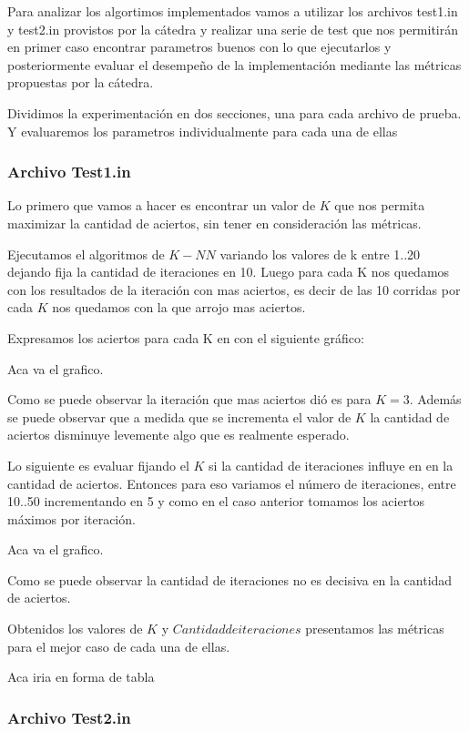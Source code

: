 Para analizar los algortimos implementados vamos a utilizar los archivos test1.in y test2.in provistos por la cátedra y realizar una serie de test que nos permitirán en primer caso encontrar parametros buenos con lo que ejecutarlos y posteriormente evaluar el desempeño de la implementación mediante las métricas propuestas por la cátedra.

Dividimos la experimentación en dos secciones, una para cada archivo de prueba. Y evaluaremos los parametros individualmente para cada una de ellas


\subsubsection {Archivo Test1.in}


Lo primero que vamos a hacer es encontrar un valor de $K$ que nos permita maximizar la cantidad de aciertos, sin tener en consideración las métricas.

Ejecutamos el algoritmos de $K-NN$ variando los valores de k entre {1..20} dejando fija la cantidad de iteraciones en 10. Luego para cada K nos quedamos con los resultados de la iteración con mas aciertos, es decir de las 10 corridas por cada $K$ nos quedamos con la que arrojo mas aciertos.

Expresamos los aciertos para cada K en con el siguiente gráfico:

Aca va el grafico.

Como se puede observar la iteración que mas aciertos dió es para $K = 3$. Además se puede observar que a medida que se incrementa el valor de $K$ la cantidad de aciertos disminuye levemente algo que es realmente esperado.

Lo siguiente es evaluar fijando el $K$ si la cantidad de iteraciones influye en en la cantidad de aciertos. Entonces para eso variamos el número de iteraciones, entre {10..50} incrementando en 5 y como en el caso anterior tomamos los aciertos máximos por iteración.

Aca va el grafico.

Como se puede observar la cantidad de iteraciones no es decisiva en la cantidad de aciertos.

Obtenidos los valores de $K$ y $Cantidad de iteraciones$ presentamos las métricas para el mejor caso de cada una de ellas.

Aca iria en forma de tabla





\subsubsection {Archivo Test2.in}




